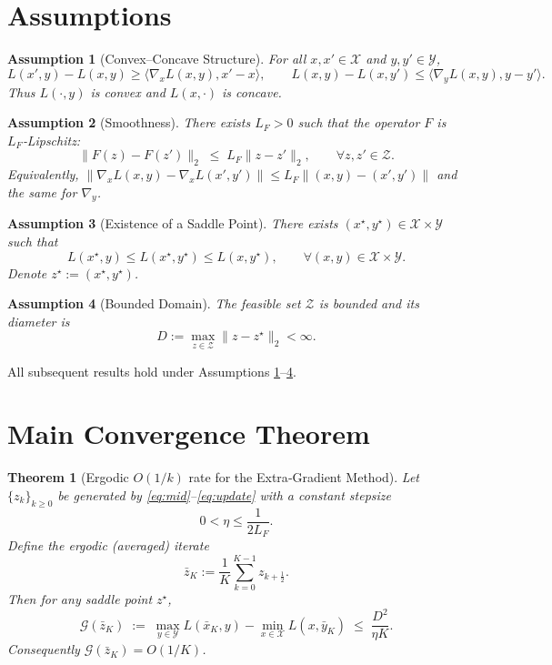\documentclass{article}
\newtheorem{theorem}{Theorem}
\newtheorem{assumption}{Assumption}
\newcommand{\gap}{\mathcal{G}}
\begin{document}
\newpage
\section*{Assumptions}
\begin{assumption}[Convex–Concave Structure]\label{ass:cc}
For all $x,x'\in\mathcal{X}$ and $y,y'\in\mathcal{Y}$,
\[
L(x',y)-L(x,y)\ge\langle\nabla_{x}L(x,y),x'-x\rangle,\qquad
L(x,y)-L(x,y')\le\langle\nabla_{y}L(x,y),y-y'\rangle .
\]
Thus $L(\cdot,y)$ is convex and $L(x,\cdot)$ is concave.
\end{assumption}

\begin{assumption}[Smoothness]\label{ass:smooth}
There exists $L_{F}>0$ such that the operator $F$ is $L_{F}$‑Lipschitz:
\[
\|F(z)-F(z')\|_{2}\;\le\;L_{F}\|z-z'\|_{2},
\qquad\forall z,z'\in\mathcal{Z}.
\]
Equivalently,
$\|\nabla_{x}L(x,y)-\nabla_{x}L(x',y')\|\le L_{F}\|(x,y)-(x',y')\|$ and the same for $\nabla_{y}$.
\end{assumption}

\begin{assumption}[Existence of a Saddle Point]\label{ass:exist}
There exists $(x^{\star},y^{\star})\in\mathcal{X}\times\mathcal{Y}$ such that
\[
L(x^{\star},y)\le L(x^{\star},y^{\star})\le L(x,y^{\star}),\qquad\forall (x,y)\in\mathcal{X}\times\mathcal{Y}.
\]
Denote $z^{\star}:=(x^{\star},y^{\star})$.
\end{assumption}

\begin{assumption}[Bounded Domain]\label{ass:bounded}
The feasible set $\mathcal{Z}$ is bounded and its diameter is
\[
D:=\max_{z\in\mathcal{Z}}\|z-z^{\star}\|_{2}<\infty .
\]
\end{assumption}

All subsequent results hold under Assumptions \ref{ass:cc}–\ref{ass:bounded}.

\section*{Main Convergence Theorem}
\begin{theorem}[Ergodic $O(1/k)$ rate for the Extra‑Gradient Method]\label{thm:eg}
Let $\{z_{k}\}_{k\ge0}$ be generated by \eqref{eq:mid}–\eqref{eq:update} with a constant stepsize
\[
0<\eta\le\frac{1}{2L_{F}}.
\]
Define the ergodic (averaged) iterate
\[
\bar z_{K}:=\frac{1}{K}\sum_{k=0}^{K-1}z_{k+\frac12}.
\]
Then for any saddle point $z^{\star}$,
\[
\gap(\bar z_{K})\;:=\;\max_{y\in\mathcal{Y}}L(\bar x_{K},y)-\min_{x\in\mathcal{X}}L(x,\bar y_{K})
\;\le\;\frac{D^{2}}{\eta K}.
\]
Consequently $\gap(\bar z_{K})=O(1/K)$.
\end{theorem}
\end{document}
